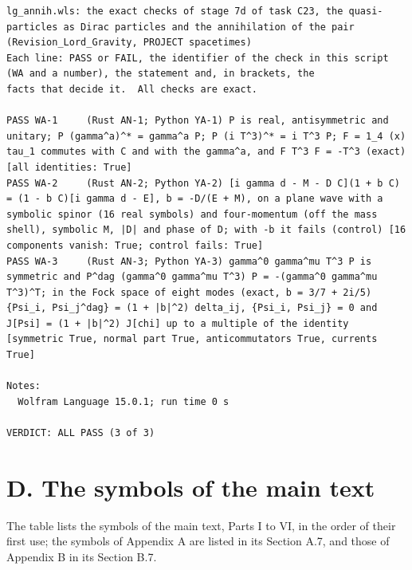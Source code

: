\documentclass[
  10pt,
]{article}
\begin{document}
\begin{verbatim}
lg_annih.wls: the exact checks of stage 7d of task C23, the quasi-particles as Dirac particles and the annihilation of the pair (Revision_Lord_Gravity, PROJECT spacetimes)
Each line: PASS or FAIL, the identifier of the check in this script (WA and a number), the statement and, in brackets, the
facts that decide it.  All checks are exact.

PASS WA-1     (Rust AN-1; Python YA-1) P is real, antisymmetric and unitary; P (gamma^a)^* = gamma^a P; P (i T^3)^* = i T^3 P; F = 1_4 (x) tau_1 commutes with C and with the gamma^a, and F T^3 F = -T^3 (exact) [all identities: True]
PASS WA-2     (Rust AN-2; Python YA-2) [i gamma d - M - D C](1 + b C) = (1 - b C)[i gamma d - E], b = -D/(E + M), on a plane wave with a symbolic spinor (16 real symbols) and four-momentum (off the mass shell), symbolic M, |D| and phase of D; with -b it fails (control) [16 components vanish: True; control fails: True]
PASS WA-3     (Rust AN-3; Python YA-3) gamma^0 gamma^mu T^3 P is symmetric and P^dag (gamma^0 gamma^mu T^3) P = -(gamma^0 gamma^mu T^3)^T; in the Fock space of eight modes (exact, b = 3/7 + 2i/5) {Psi_i, Psi_j^dag} = (1 + |b|^2) delta_ij, {Psi_i, Psi_j} = 0 and J[Psi] = (1 + |b|^2) J[chi] up to a multiple of the identity [symmetric True, normal part True, anticommutators True, currents True]

Notes:
  Wolfram Language 15.0.1; run time 0 s

VERDICT: ALL PASS (3 of 3)
\end{verbatim}

\hypertarget{d.-the-symbols-of-the-main-text}{%
\section{D. The symbols of the main
text}\label{d.-the-symbols-of-the-main-text}}

The table lists the symbols of the main text, Parts I to VI, in the
order of their first use; the symbols of Appendix A are listed in its
Section A.7, and those of Appendix B in its Section B.7.
\end{document}
